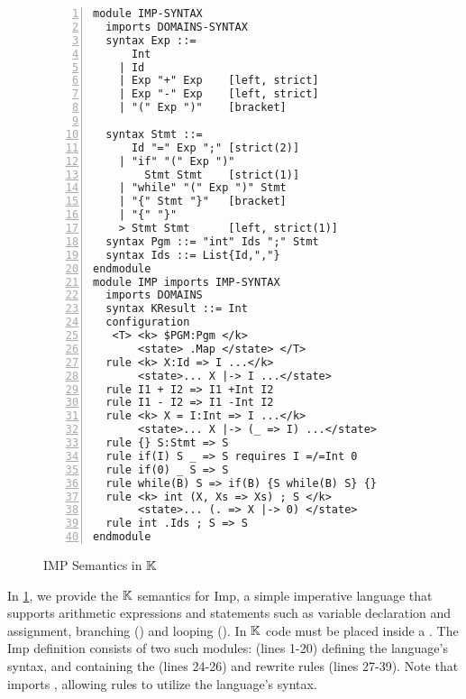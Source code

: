 \begin{figure}[H]
  \centering
  \begin{lstlisting}[style=ksty, language=k,  multicols=2,
  basicstyle=\ttfamily\notsotiny, numbers=left
  ,showspaces=false
  ,xleftmargin=2em]
module IMP-SYNTAX
  imports DOMAINS-SYNTAX
  syntax Exp ::=
      Int
    | Id
    | Exp "+" Exp    [left, strict]
    | Exp "-" Exp    [left, strict]
    | "(" Exp ")"    [bracket]

  syntax Stmt ::=
      Id "=" Exp ";" [strict(2)]
    | "if" "(" Exp ")"
        Stmt Stmt    [strict(1)]
    | "while" "(" Exp ")" Stmt
    | "{" Stmt "}"   [bracket]
    | "{" "}"
    > Stmt Stmt      [left, strict(1)]
  syntax Pgm ::= "int" Ids ";" Stmt
  syntax Ids ::= List{Id,","}
endmodule
module IMP imports IMP-SYNTAX
  imports DOMAINS
  syntax KResult ::= Int
  configuration
   <T> <k> $PGM:Pgm </k>
       <state> .Map </state> </T>
  rule <k> X:Id => I ...</k>
       <state>... X |-> I ...</state>
  rule I1 + I2 => I1 +Int I2
  rule I1 - I2 => I1 -Int I2
  rule <k> X = I:Int => I ...</k>
       <state>... X |-> (_ => I) ...</state>
  rule {} S:Stmt => S
  rule if(I) S _ => S requires I =/=Int 0
  rule if(0) _ S => S
  rule while(B) S => if(B) {S while(B) S} {}
  rule <k> int (X, Xs => Xs) ; S </k>
       <state>... (. => X |-> 0) </state>
  rule int .Ids ; S => S
endmodule
\end{lstlisting}
  \caption{IMP Semantics in $\mathbb{K}$}\label{fig:imp-semantics}
\end{figure}

In \figurename{} \ref{fig:imp-semantics}, we provide the $\mathbb{K}$ semantics
for Imp, a simple imperative language that supports arithmetic expressions and
statements such as variable declaration and assignment, branching () and looping ().
In $\mathbb{K}{}$ code must be placed inside a . The Imp definition
consists of two such modules:  (lines 1-20) defining the language's
syntax, and  containing the  (lines 24-26)
and rewrite rules (lines 27-39). Note that  imports
, allowing rules to utilize the language's syntax.

